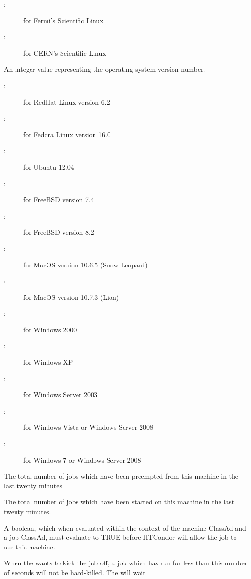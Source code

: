 \begin{description}
\begin{description}
	\item[:] for Fermi's Scientific Linux
	\item[:] for CERN's Scientific Linux
	\end{description}
%
\item[\AdAttr{OpSysVer}:] An integer value representing the operating system
version number.
	\begin{description}
	\item[:] for RedHat Linux version 6.2
	\item[:] for Fedora Linux version 16.0
	\item[:] for Ubuntu 12.04
	\item[:] for FreeBSD version 7.4
	\item[:] for FreeBSD version 8.2
	\item[:] for MacOS version 10.6.5 (Snow Leopard)
	\item[:] for MacOS version 10.7.3 (Lion)
	\item[:] for Windows 2000
	\item[:] for Windows XP
	\item[:] for Windows Server 2003
	\item[:] for Windows Vista or Windows Server 2008
	\item[:] for Windows 7 or Windows Server 2008
	\end{description}
%
\item[\AdAttr{RecentPreemptions}:] The total number of jobs which 
have been preempted from this machine in the last twenty minutes.
%
\item[\AdAttr{RecentTotalJobStarts}:] The total number of jobs which 
have been started on this machine in the last twenty minutes.
%
\item[\AdAttr{Requirements}:] A boolean, which when evaluated within the context
of the machine ClassAd and a job ClassAd, must evaluate to
TRUE before HTCondor will allow the job to use this machine.
%
\item[\AdAttr{MaxJobRetirementTime}:] When the  wants
to kick the job off, a job which has run for less than this number
of seconds will not be hard-killed.  The  will wait

\end{description}
